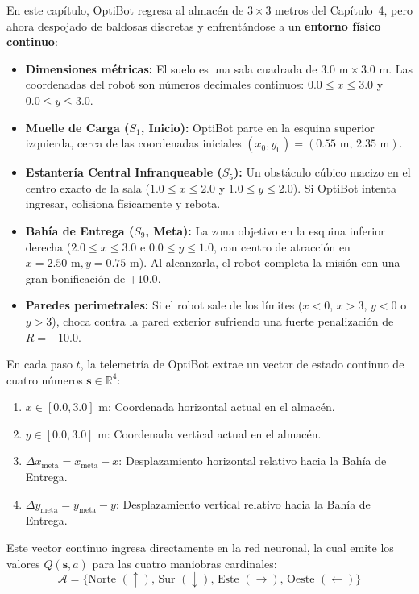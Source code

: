 \begin{optibot}
En este capítulo, OptiBot regresa al almacén de $3 \times 3$ metros del Capítulo~4, pero ahora despojado de baldosas discretas y enfrentándose a un \textbf{entorno físico continuo}:
\begin{itemize}
  \item \textbf{Dimensiones métricas:} El suelo es una sala cuadrada de $3.0\text{ m} \times 3.0\text{ m}$. Las coordenadas del robot son números decimales continuos: $0.0 \le x \le 3.0$ y $0.0 \le y \le 3.0$.
  \item \textbf{Muelle de Carga ($S_1$, Inicio):} OptiBot parte en la esquina superior izquierda, cerca de las coordenadas iniciales $(x_0, y_0) = (0.55\text{ m}, \, 2.35\text{ m})$.
  \item \textbf{Estantería Central Infranqueable ($S_5$):} Un obstáculo cúbico macizo en el centro exacto de la sala ($1.0 \le x \le 2.0$ y $1.0 \le y \le 2.0$). Si OptiBot intenta ingresar, colisiona físicamente y rebota.
  \item \textbf{Bahía de Entrega ($S_9$, Meta):} La zona objetivo en la esquina inferior derecha ($2.0 \le x \le 3.0$ e $0.0 \le y \le 1.0$, con centro de atracción en $x=2.50\text{ m}, y=0.75\text{ m}$). Al alcanzarla, el robot completa la misión con una gran bonificación de $+10.0$.
  \item \textbf{Paredes perimetrales:} Si el robot sale de los límites ($x<0$, $x>3$, $y<0$ o $y>3$), choca contra la pared exterior sufriendo una fuerte penalización de $R = -10.0$.
\end{itemize}

En cada paso $t$, la telemetría de OptiBot extrae un vector de estado continuo de cuatro números $\mathbf{s} \in \mathbb{R}^4$:
\begin{enumerate}
  \item $x \in [0.0, 3.0]\text{ m}$: Coordenada horizontal actual en el almacén.
  \item $y \in [0.0, 3.0]\text{ m}$: Coordenada vertical actual en el almacén.
  \item $\Delta x_{\text{meta}} = x_{\text{meta}} - x$: Desplazamiento horizontal relativo hacia la Bahía de Entrega.
  \item $\Delta y_{\text{meta}} = y_{\text{meta}} - y$: Desplazamiento vertical relativo hacia la Bahía de Entrega.
\end{enumerate}

Este vector continuo ingresa directamente en la red neuronal, la cual emite los valores $Q(\mathbf{s}, a)$ para las cuatro maniobras cardinales:
\[
  \mathcal{A} = \{\text{Norte } (\uparrow), \, \text{Sur } (\downarrow), \, \text{Este } (\rightarrow), \, \text{Oeste } (\leftarrow)\}
\]
\end{optibot}

